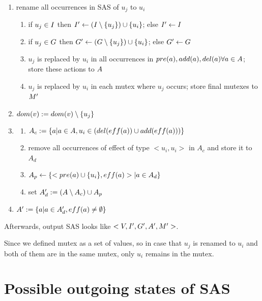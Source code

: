 	\begin{enumerate}
		\item rename all occurrences in SAS of $u_j$ to $u_i$ \label{MSC:out:rename} \begin{enumerate}
			\item if $u_j \in I$ then $I{}' \leftarrow (I \setminus \{u_j\}) \cup \{u_i\}$; else $I{}' \leftarrow I$
			\item if $u_j \in G$ then $G{}' \leftarrow (G \setminus \{u_j\}) \cup \{u_i\}$; else $G{}' \leftarrow G$
			\item $u_j$ is replaced by $u_i$ in all occurrences in $pre(a), add(a), del(a) \forall a \in A$; store these actions to $A$
			\item $u_j$ is replaced by $u_i$ in each mutex where $u_j$ occurs; store final mutexes to $M{}'$
		\end{enumerate}	
		\item $dom(v) := dom(v) \setminus \{u_j\}$ \label{MSC:out:mergeValues}
		\item \begin{enumerate} 
			\item $A_c := \{a | a \in A, u_i \in (del(eff(a)) \cup add(eff(a))) \}$ \label{MSC:out:changeOperators:1}
			\item remove all occurrences of effect of type $<u_i, u_i>$ in $A_c$ and store it to $A_d$ \label{MSC:out:changeOperators:2}
			\item $A_p \leftarrow \{<pre(a) \cup \{u_i\},eff(a)> | a \in A_d \}$ \label{MSC:out:addPre}
			\item set $A_d' := (A \setminus A_c) \cup A_p$ \label{MSC:out:changeOperators:3}
		\end{enumerate} 
		\item $A{}' := \{a | a \in A_d', eff(a) \neq \emptyset \}$ \label{MSC:out:removeOperators}
	\end{enumerate}
	
	Afterwards, output SAS looks like $<V, I{}', G{}', A{}', M{}'>$.
	
	Since we defined mutex as a set of values, so in case that $u_j$ is renamed to $u_i$ and both of them are in the same mutex, only $u_i$ remains in the mutex.
	
	
	\section{Possible outgoing states of SAS}
	
